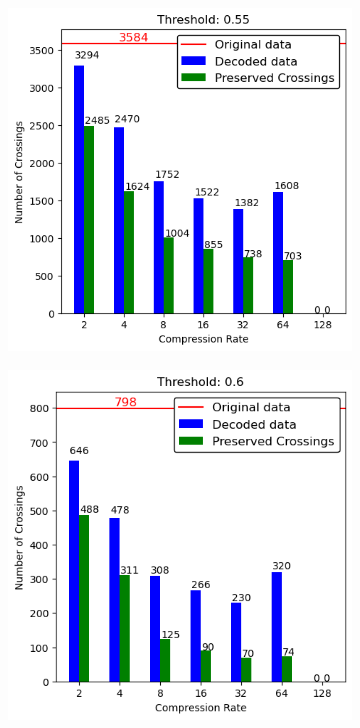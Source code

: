 \begin{appendices}
\begin{figure}
\begin{subfigure}{.5\textwidth}
	\end{subfigure}
	\hfill
	\begin{subfigure}{.5\textwidth}
		\includegraphics[width=\textwidth]{../../Images/spikes_threshold_055.png}
	\end{subfigure}
	\begin{subfigure}{.5\textwidth}
		\includegraphics[width=\textwidth]{../../Images/spikes_threshold_06.png}

\end{subfigure}
\end{figure}
\end{appendices}
